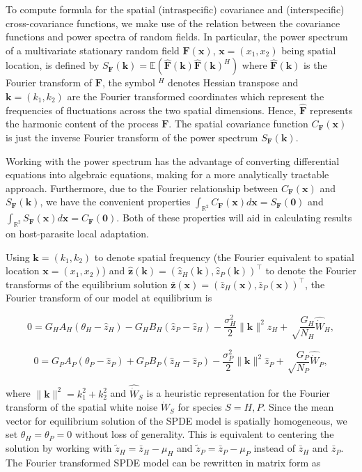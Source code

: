 \documentclass{article}
\begin{document}
To compute formula for the spatial (intraspecific) covariance and
(interspecific) cross-covariance functions, we make use of the relation
between the covariance functions and power spectra of random fields. In
particular, the power spectrum of a multivariate stationary random field
\(\pmb F(\pmb x)\), \(\pmb x=(x_1,x_2)\) being spatial location, is
defined by
\(S_{\pmb F}(\pmb k)=\mathbb E\left(\hat{\pmb F}(\pmb k)\hat{\pmb F}(\pmb k)^H\right)\)
where \(\hat{\pmb F}(\pmb k)\) is the Fourier transform of \(\pmb F\),
the symbol \(^H\) denotes Hessian transpose and \(\pmb k=(k_1,k_2)\) are
the Fourier transformed coordinates which represent the frequencies of
fluctuations across the two spatial dimensions. Hence, \(\hat{\pmb F}\)
represents the harmonic content of the process \(\pmb F\). The spatial
covariance function \(C_{\pmb F}(\pmb x)\) is just the inverse Fourier
transform of the power spectrum \(S_{\pmb F}(\pmb k)\).

Working with the power spectrum has the advantage of converting
differential equations into algebraic equations, making for a more
analytically tractable approach. Furthermore, due to the Fourier
relationship between \(C_{\pmb F}(\pmb x)\) and \(S_{\pmb F}(\pmb k)\),
we have the convenient properties
\(\int_{\mathbb R^2}C_{\pmb F}(\pmb x)d\pmb x=S_{\pmb F}(\pmb 0)\) and
\(\int_{\mathbb R^2}S_{\pmb F}(\pmb x)d\pmb x=C_{\pmb F}(\pmb 0)\). Both
of these properties will aid in calculating results on host-parasite
local adaptation.

Using \(\pmb k=(k_1,k_2)\) to denote spatial frequency (the Fourier
equivalent to spatial location \(\pmb x=(x_1,x_2)\)) and
\(\hat{\pmb z}(\pmb k)=(\hat z_H(\pmb k),\hat z_P(\pmb k))^\top\) to
denote the Fourier transforms of the equilibrium solution
\(\bar{\pmb z}(\pmb x)=(\bar z_H(\pmb x),\bar z_P(\pmb x))^\top\), the
Fourier transform of our model at equilibrium is

\[0=G_HA_H(\theta_H-\hat z_H)-G_HB_H(\hat z_P-\hat z_H)-\frac{\sigma_H^2}{2}\|\pmb k\|^2\hat z_H+\sqrt\frac{G_H}{N_H}\widehat{\dot W}_H,\]

\[0=G_PA_P(\theta_P-\hat z_P)+G_PB_P(\hat z_H-\hat z_P)-\frac{\sigma_P^2}{2}\|\pmb k\|^2\hat z_P+\sqrt\frac{G_P}{N_P}\widehat{\dot W}_P,\]

where \(\|\pmb k\|^2=k_1^2+k_2^2\) and \(\widehat{\dot W}_S\) is a
heuristic representation for the Fourier transform of the spatial white
noise \(\dot W_S\) for species \(S=H,P\). Since the mean vector for
equilibrium solution of the SPDE model is spatially homogeneous, we set
\(\theta_H=\theta_P=0\) without loss of generality. This is equivalent
to centering the solution by working with \(\tilde z_H=\bar z_H-\mu_H\)
and \(\tilde z_P=\bar z_P-\mu_P\) instead of \(\bar z_H\) and
\(\bar z_P\). The Fourier transformed SPDE model can be rewritten in
matrix form as
\end{document}
